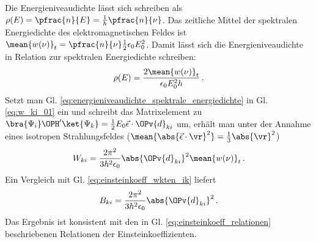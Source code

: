 Die Energieniveaudichte lässt sich schreiben als
$\rho(E)=\pfrac{n}{E}=\frac{1}{h}\pfrac{n}{\nu}$.
Das zeitliche Mittel der spektralen Energiedichte des elektromagnetischen Feldes
ist $\mean{w(\nu)}_t=\pfrac{n}{\nu}\frac{1}{2}\epsilon_0 E^2_0$. Damit lässt
sich die Energieniveaudichte in Relation zur spektralen Energiedichte schreiben:
\begin{equation}\label{eq:energieniveaudichte_spektrale_energiedichte}
	\rho(E)=\frac{2\mean{w(\nu)}_t}{\epsilon_0 E_0^2h}\,.
\end{equation}
Setzt man Gl. \eqref{eq:energieniveaudichte_spektrale_energiedichte} in
Gl. \eqref{eq:w_ki_01} ein und schreibt das Matrixelement
zu $\bra{\Psi_i}\OPH'\ket{\Psi_k} =
\frac{1}{2}E_0\vec{\epsilon}\cdot\OPv{d}_{ki}$ um, erhält
man unter der Annahme eines isotropen Strahlungsfeldes
($\mean{\abs{\vec{\epsilon}\cdot\vr}^2} = \frac{1}{3}\abs{\vr}^2$)
\begin{equation}\label{eq:w_ki_02}
	W_{ki}
	= \frac{2\pi^2}{3h^2\epsilon_0}\abs{\OPv{d}_{ki}}^2\mean{w(\nu)}_t\,.
\end{equation}
Ein Vergleich mit Gl. \eqref{eq:einsteinkoeff_wkten_ik} liefert
\begin{equation}\label{eq:einstein_koeff_B}
	B_{ki} = \frac{2\pi^2}{3h^2\epsilon_0}\abs{\OPv{d}_{ki}}^2\,.
\end{equation}
Das Ergebnis ist konsistent mit den in Gl.
\eqref{eq:einsteinkoeff_relationen} beschriebenen Relationen der
Einsteinkoeffizienten.

